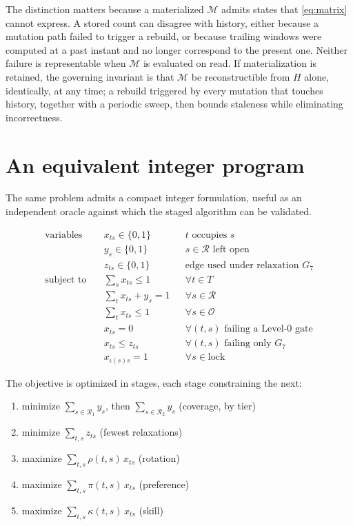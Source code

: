 \documentclass[11pt,a4paper]{article}
\theoremstyle{definition}
\theoremstyle{remark}
\begin{document}
The distinction matters because a materialized $\mathcal{M}$ admits states
that \eqref{eq:matrix} cannot express. A stored count can disagree with
history, either because a mutation path failed to trigger a rebuild, or
because trailing windows were computed at a past instant and no longer
correspond to the present one. Neither failure is representable when
$\mathcal{M}$ is evaluated on read. If materialization is retained, the
governing invariant is that $\mathcal{M}$ be reconstructible from $H$ alone,
identically, at any time; a rebuild triggered by every mutation that touches
history, together with a periodic sweep, then bounds staleness while
eliminating incorrectness.

\section{An equivalent integer program}
\label{sec:ilp}

The same problem admits a compact integer formulation, useful as an
independent oracle against which the staged algorithm can be validated.

\begin{align}
\text{variables}\quad
& x_{ts} \in \{0,1\} && \text{$t$ occupies $s$} \\
& y_s \in \{0,1\} && \text{$s \in \mathcal{R}$ left open} \\
& z_{ts} \in \{0,1\} && \text{edge used under relaxation } G_7 \\[0.4em]
\text{subject to}\quad
& \textstyle\sum_{s} x_{ts} \leq 1 && \forall t \in T \\
& \textstyle\sum_{t} x_{ts} + y_s = 1 && \forall s \in \mathcal{R} \\
& \textstyle\sum_{t} x_{ts} \leq 1 && \forall s \in \mathcal{O} \\
& x_{ts} = 0 && \forall (t,s) \text{ failing a Level-0 gate} \\
& x_{ts} \leq z_{ts} && \forall (t,s) \text{ failing only } G_7 \\
& x_{\iota(s)s} = 1 && \forall s \in \mathrm{lock}
\end{align}

The objective is optimized in stages, each stage constraining the next:
\begin{enumerate}[itemsep=0.1em,topsep=0.25em]
  \item minimize $\sum_{s \in \mathcal{R}_1} y_s$, then
        $\sum_{s \in \mathcal{R}_2} y_s$ \hfill (coverage, by tier)
  \item minimize $\sum_{t,s} z_{ts}$ \hfill (fewest relaxations)
  \item maximize $\sum_{t,s} \rho(t,s)\, x_{ts}$ \hfill (rotation)
  \item maximize $\sum_{t,s} \pi(t,s)\, x_{ts}$ \hfill (preference)
  \item maximize $\sum_{t,s} \kappa(t,s)\, x_{ts}$ \hfill (skill)
\end{enumerate}
\end{document}
